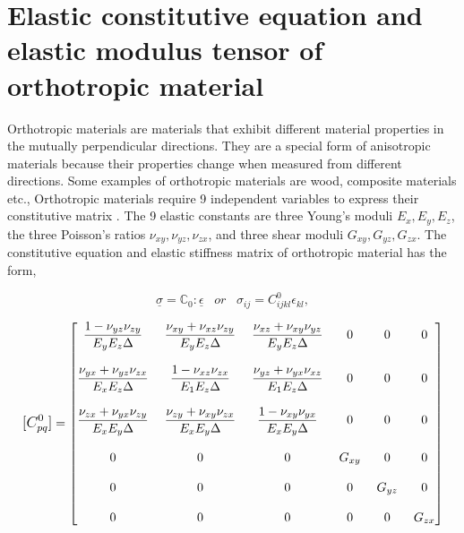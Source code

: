 \documentclass[12pt,a4paper,twoside,openright]{report}
\begin{document}
\section{Elastic constitutive equation and elastic modulus tensor of orthotropic material}\label{Constitutive matrix}
\indent\indent\indent Orthotropic materials are materials that exhibit different material properties in the mutually perpendicular directions. They are a special form of anisotropic materials because their properties change when measured from different directions. Some examples of orthotropic materials are wood, composite materials etc., Orthotropic materials require 9 independent variables to express their constitutive matrix \citep{ortho}. The 9 elastic constants are three Young's moduli $E_{x},E_{y},E_{z}$, the three Poisson's ratios $\nu_{xy},\nu_{yz},\nu_{zx}$, and three shear moduli $G_{xy},G_{yz},G_{zx}$. The constitutive equation and elastic stiffness matrix of orthotropic material \citep{lempriere1968poisson} has the form,

\begin{equation}
  \underline{\sigma} = \mathbb{C}_{0} : \underline{\epsilon} \;\;\;   or \;\;\;  \sigma_{ij}  =  C^{0}_{ijkl}\epsilon_{kl},
\end{equation}

$$
\mathlarger{ [C^{0}_{pq}]} =  
 \begin{bmatrix}
 \mathlarger{ \frac{1 - \nu_{yz}\nu_{zy}}{E_{y}E_{z}\Delta} } \;&  \mathlarger{  \frac{\nu_{xy} + \nu_{xz}\nu_{zy}}{E_{y}E_{z}\Delta}}   \;& \mathlarger{  \frac{\nu_{xz} + \nu_{xy}\nu_{yz}}{E_{y}E_{z}\Delta} }  \;&  \mathlarger{  0}  \;&  \mathlarger{ 0}  \;& \mathlarger{  0}  \\
 \\
    \mathlarger{ \frac{\nu_{yx} + \nu_{yz}\nu_{zx}}{E_{x}E_{z}\Delta} }  \;& \mathlarger{  \frac{1 - \nu_{xz}\nu_{zx}}{E_{1}E_{z}\Delta} }\; & \mathlarger{ \frac{\nu_{yz} +\nu_{yx}\nu_{xz}}{E_{1}E_{z}\Delta} } \; & \mathlarger{ 0}\; &\mathlarger{  0}\; & \mathlarger{ 0}\\
  \\
   \mathlarger{  \frac{\nu_{zx} + \nu_{yx}\nu_{zy}}{E_{x}E_{y}\Delta}}  \;& \mathlarger{   \frac{\nu_{zy} + \nu_{xy}\nu_{zx}}{E_{x}E_{y}\Delta} }\;&\mathlarger{  \frac{1 - \nu_{xy}\nu_{yx}}{E_{x}E_{y}\Delta} } \;&\mathlarger{  0 }\;& \mathlarger{ 0 }\;&\mathlarger{  0} \\ 
\\

 
 \mathlarger{  0} \;&  \mathlarger{  0 } \;&  \mathlarger{  0 }\;&\mathlarger{ G_{xy}} \;& \mathlarger{0} \;& \mathlarger{0} \\
  \\
 \mathlarger{ 0} \;&  \mathlarger{  0 }\;&  \mathlarger{  0 } \;& \mathlarger{0 }\;& \mathlarger{ G_{yz} }\;&\mathlarger{ 0} \\
  \\
  \mathlarger{0}\;&  \mathlarger{  0 } \;&  \mathlarger{  0 } \;& \mathlarger{0 }\;& \mathlarger{0} \;& \mathlarger{G_{zx}} 
 \end{bmatrix}
 $$\\
 
\end{document}
